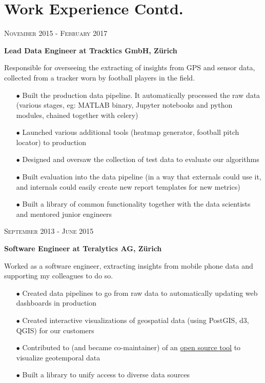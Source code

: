 \documentclass[9pt]{article} %
\begin{document}
\begin{minipage}[t]{0.44\textwidth}
\section{Work Experience Contd.} 
{\raggedleft\textsc{November 2015 - February 2017}\par}
{\raggedright\large \textbf{Lead Data Engineer at Tracktics GmbH, Z\"urich}\\
}
\normalsize{Responsible for overseeing the extracting of insights from GPS and sensor data, collected from a tracker worn by football players in the field.}
\begin{itemize}
\item[$\bullet$] Built the production data pipeline. It automatically processed the raw data (various stages, eg:  MATLAB binary, Jupyter notebooks and python modules, chained together with celery)
\item[$\bullet$] Launched various additional tools (heatmap generator, football pitch locator) to production
\item[$\bullet$] Designed and oversaw the collection of test data to evaluate our algorithms
\item[$\bullet$] Built evaluation into the data pipeline (in a way that externals could use it, and internals could easily create new report templates for new metrics)
\item[$\bullet$] Built a library of common functionality together with the data scientists and mentored junior engineers
\end{itemize}

{\raggedleft\textsc{September 2013 - June 2015}\par}
{\raggedright\large \textbf{Software Engineer at Teralytics AG, Z\"urich}\\
}
\normalsize{Worked as a software engineer, extracting insights from mobile phone data and supporting my colleagues to do so.}
\begin{itemize}
\item[$\bullet$] Created data pipelines to go from raw data to automatically updating web dashboards in production 
\item[$\bullet$] Created interactive visualizations of geospatial data (using PostGIS, d3, QGIS) for our customers
\item[$\bullet$] Contributed to (and became co-maintainer) of an \href{http://github.com/anitagraser/TimeManager}{open source tool} to visualize geotemporal data
\item[$\bullet$] Built a library to unify access to diverse data sources
\end{itemize}


\end{minipage}
\end{document}
